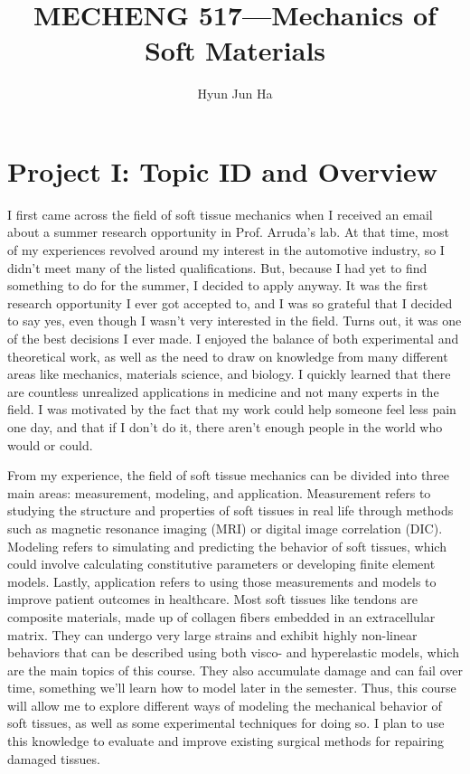 \documentclass[preprint,12pt,authoryear]{elsarticle}
\begin{document}
\begin{frontmatter}

\title{MECHENG 517---Mechanics of Soft Materials}

\author{Hyun Jun Ha} 

\end{frontmatter}


\section*{Project I: Topic ID and Overview}

I first came across the field of soft tissue mechanics when I received an email about a summer research opportunity in Prof. Arruda's lab. At that time, most of my experiences revolved around my interest in the automotive industry, so I didn't meet many of the listed qualifications. But, because I had yet to find something to do for the summer, I decided to apply anyway. It was the first research opportunity I ever got accepted to, and I was so grateful that I decided to say yes, even though I wasn't very interested in the field. Turns out, it was one of the best decisions I ever made. I enjoyed the balance of both experimental and theoretical work, as well as the need to draw on knowledge from many different areas like mechanics, materials science, and biology. I quickly learned that there are countless unrealized applications in medicine and not many experts in the field. I was motivated by the fact that my work could help someone feel less pain one day, and that if I don't do it, there aren't enough people in the world who would or could.

From my experience, the field of soft tissue mechanics can be divided into three main areas: measurement, modeling, and application. Measurement refers to studying the structure and properties of soft tissues in real life through methods such as magnetic resonance imaging (MRI) or digital image correlation (DIC). Modeling refers to simulating and predicting the behavior of soft tissues, which could involve calculating constitutive parameters or developing finite element models. Lastly, application refers to using those measurements and models to improve patient outcomes in healthcare. Most soft tissues like tendons are composite materials, made up of collagen fibers embedded in an extracellular matrix. They can undergo very large strains and exhibit highly non-linear behaviors that can be described using both visco- and hyperelastic models, which are the main topics of this course. They also accumulate damage and can fail over time, something we'll learn how to model later in the semester. Thus, this course will allow me to explore different ways of modeling the mechanical behavior of soft tissues, as well as some experimental techniques for doing so. I plan to use this knowledge to evaluate and improve existing surgical methods for repairing damaged tissues.
\end{document}
